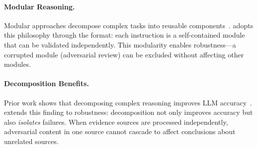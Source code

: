 \paragraph{Modular Reasoning.}
Modular approaches decompose complex tasks into reusable components~\cite{andreas2016neural}.
\method adopts this philosophy through the \script format: each instruction is a self-contained module that can be validated independently.
This modularity enables robustness---a corrupted module (adversarial review) can be excluded without affecting other modules.

\paragraph{Decomposition Benefits.}
Prior work shows that decomposing complex reasoning improves LLM accuracy~\cite{zhou2022least}.
\method extends this finding to robustness: decomposition not only improves accuracy but also \emph{isolates} failures.
When evidence sources are processed independently, adversarial content in one source cannot cascade to affect conclusions about unrelated sources.
